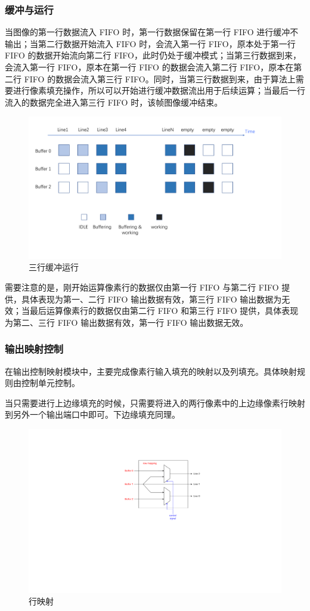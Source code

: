 \documentclass[12pt, a4paper, oneside]{ctexbook}
\begin{document}
	\subsubsection{缓冲与运行}
	当图像的第一行数据流入 FIFO 时，第一行数据保留在第一行 FIFO 进行缓冲不输出；当第二行数据开始流入 FIFO 时，会流入第一行 FIFO，原本处于第一行 FIFO 的数据开始流向第二行 FIFO，此时仍处于缓冲模式；当第三行数据到来，会流入第一行 FIFO，原本在第一行 FIFO 的数据会流入第二行 FIFO，原本在第二行 FIFO 的数据会流入第三行 FIFO。同时，当第三行数据到来，由于算法上需要进行像素填充操作，所以可以开始进行缓冲数据流出用于后续运算；当最后一行流入的数据完全进入第三行 FIFO 时，该帧图像缓冲结束。
		\begin{figure}[h]
			\centering
			\includegraphics[scale=0.4]{pic/fifo_3_2.pdf}
			\caption{三行缓冲运行}
		\end{figure}
	\par 需要注意的是，刚开始运算像素行的数据仅由第一行 FIFO 与第二行 FIFO 提供，具体表现为第一、二行 FIFO 输出数据有效，第三行 FIFO 输出数据为无效；当最后运算像素行的数据仅由第二行 FIFO 和第三行 FIFO 提供，具体表现为第二、三行 FIFO 输出数据有效，第一行 FIFO 输出数据无效。
	\subsubsection{输出映射控制}
	在输出控制映射模块中，主要完成像素行输入填充的映射以及列填充。具体映射规则由控制单元控制。\par 当只需要进行上边缘填充的时候，只需要将进入的两行像素中的上边缘像素行映射到另外一个输出端口中即可。下边缘填充同理。
		\begin{figure}[h]
		\centering
		\includegraphics[scale=1]{pic/row_mapping.pdf}
		\caption{行映射}
		\end{figure}	
\end{document}
